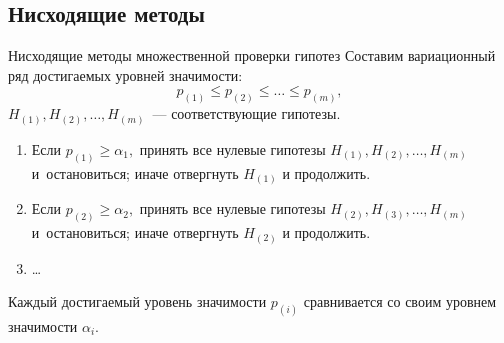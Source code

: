 \documentclass[9pt,pdf,utf8,hyperref={unicode},aspectratio=169]{beamer}
\renewcommand{\leq}{\leqslant}
\renewcommand{\geq}{\geqslant}
\begin{document}
\subsection{Нисходящие методы}
\begin{frame}{Нисходящие методы множественной проверки гипотез}
    Составим вариационный ряд достигаемых уровней значимости: $$p_{(1)}\leq p_{(2)} \leq \ldots \leq p_{(m)},$$
    $H_{(1)}, H_{(2)}, \ldots, H_{(m)}$~--- соответствующие гипотезы.

    \bigskip

    \begin{enumerate}
    \item Если $p_{(1)}\geq\alpha_1,$ принять все нулевые гипотезы $H_{(1)}, H_{(2)}, \ldots, H_{(m)}$ и~остановиться; иначе отвергнуть $H_{(1)}$ и продолжить.
    \item Если $p_{(2)}\geq\alpha_2,$ принять все нулевые гипотезы $H_{(2)}, H_{(3)}, \ldots, H_{(m)}$ и~остановиться; иначе отвергнуть $H_{(2)}$ и продолжить.
    \item \ldots
    \end{enumerate}

    \bigskip

    Каждый достигаемый уровень значимости $p_{(i)}$ сравнивается со своим уровнем значимости $\alpha_i$.
\end{frame}
\end{document}
